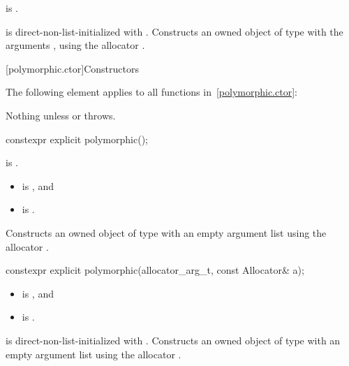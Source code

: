 \begin{itemdescr}
\pnum
\constraints
{} is .

\pnum
\effects
{} is direct-non-list-initialized with .
Constructs an owned object of type  with the arguments
,
using the allocator .
\end{itemdescr}


[polymorphic.ctor]{Constructors}

\pnum
The following element applies to all functions in~\ref{polymorphic.ctor}:

\begin{itemdescr}
\pnum
\throws
Nothing unless  or
 throws.
\end{itemdescr}

%
\begin{itemdecl}
constexpr explicit polymorphic();
\end{itemdecl}

\begin{itemdescr}
\pnum
\constraints
{} is .

\pnum
\mandates
\begin{itemize}
\item
{} is , and
\item
{} is .
\end{itemize}

\pnum
\effects
Constructs an owned object of type  with an empty argument list
using the allocator .
\end{itemdescr}

%
\begin{itemdecl}
constexpr explicit polymorphic(allocator_arg_t, const Allocator& a);
\end{itemdecl}

\begin{itemdescr}
\pnum
\mandates
\begin{itemize}
\item
{} is , and
\item
{} is .
\end{itemize}

\pnum
\effects
{} is direct-non-list-initialized with .
Constructs an owned object of type  with an empty argument list
using the allocator .
\end{itemdescr}

